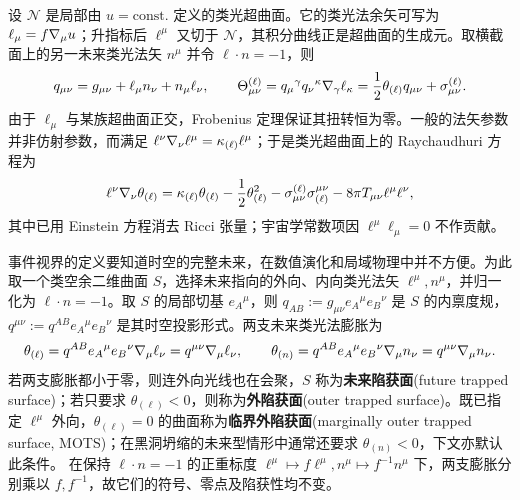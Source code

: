 设 $\mathcal N$ 是局部由 $u=\mathrm{const.}$ 定义的类光超曲面。它的类光法余矢可写为 $\ell_\mu=f\nabla_\mu u$；升指标后 $\ell^\mu$ 又切于 $\mathcal N$，其积分曲线正是超曲面的生成元。取横截面上的另一未来类光法矢 $n^\mu$ 并令 $\ell\cdot n=-1$，则
\[
    q_{\mu\nu}=g_{\mu\nu}+\ell_\mu n_\nu+n_\mu\ell_\nu,
    \qquad
    \Theta^{(\ell)}_{\mu\nu}=q_\mu{}^\gamma q_\nu{}^\kappa\nabla_\gamma\ell_\kappa
       =\frac12\theta_{(\ell)}q_{\mu\nu}+\sigma^{(\ell)}_{\mu\nu}.
\]
由于 $\ell_\mu$ 与某族超曲面正交，Frobenius 定理保证其扭转恒为零。一般的法矢参数并非仿射参数，而满足 $\ell^\nu\nabla_\nu\ell^\mu=\kappa_{(\ell)}\ell^\mu$；于是类光超曲面上的 Raychaudhuri 方程为
\begin{equation}
    \ell^\nu\nabla_\nu\theta_{(\ell)}
    =\kappa_{(\ell)}\theta_{(\ell)}
      -\frac12\theta_{(\ell)}^2
      -\sigma^{(\ell)}_{\mu\nu}\sigma_{(\ell)}^{\mu\nu}
      -8\pi T_{\mu\nu}\ell^\mu\ell^\nu,
\end{equation}
其中已用 Einstein 方程消去 Ricci 张量；宇宙学常数项因 $\ell^\mu\ell_\mu=0$ 不作贡献。

事件视界的定义要知道时空的完整未来，在数值演化和局域物理中并不方便。为此取一个类空余二维曲面 $S$，选择未来指向的外向、内向类光法矢 $\ell^\mu,n^\mu$，并归一化为 $\ell\cdot n=-1$。取 $S$ 的局部切基 $e_A{}^\mu$，则 $q_{AB}:=g_{\mu\nu}e_A{}^\mu e_B{}^\nu$ 是 $S$ 的内禀度规，$q^{\mu\nu}:=q^{AB}e_A{}^\mu e_B{}^\nu$ 是其时空投影形式。两支未来类光法膨胀为
\begin{equation}
    \theta_{(\ell)}=q^{AB}e_A{}^\mu e_B{}^\nu\nabla_\mu\ell_\nu
    =q^{\mu\nu}\nabla_\mu\ell_\nu,
    \qquad
    \theta_{(n)}=q^{AB}e_A{}^\mu e_B{}^\nu\nabla_\mu n_\nu
    =q^{\mu\nu}\nabla_\mu n_\nu.
\end{equation}
若两支膨胀都小于零，则连外向光线也在会聚，$S$ 称为\textbf{未来陷获面}(future trapped surface)；若只要求 $\theta_{(\ell)}<0$，则称为\textbf{外陷获面}(outer trapped surface)。既已指定 $\ell^\mu$ 外向，$\theta_{(\ell)}=0$ 的曲面称为\textbf{临界外陷获面}(marginally outer trapped surface, MOTS)；在黑洞坍缩的未来型情形中通常还要求 $\theta_{(n)}<0$，下文亦默认此条件。
在保持 $\ell\cdot n=-1$ 的正重标度 $\ell^\mu\mapsto f\ell^\mu,n^\mu\mapsto f^{-1}n^\mu$ 下，两支膨胀分别乘以 $f,f^{-1}$，故它们的符号、零点及陷获性均不变。

